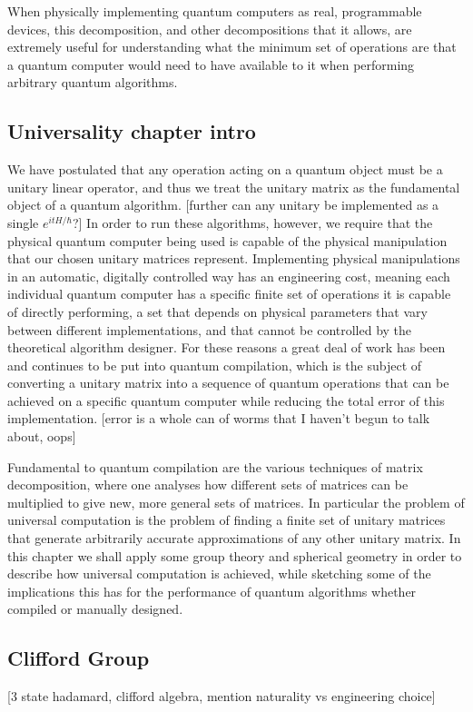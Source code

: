 \documentclass[]{article}
\begin{document}
When physically implementing quantum computers as real, programmable devices, this decomposition, and other decompositions that it allows, are extremely useful for understanding what the minimum set of operations are that a quantum computer would need to have available to it when performing arbitrary quantum algorithms.

\subsection{Universality chapter intro}
We have postulated that any operation acting on a quantum object must be a unitary linear operator, and thus we treat the unitary matrix as the fundamental object of a quantum algorithm. [further can any unitary be implemented as a single $e^{itH/\hbar}$?] In order to run these algorithms, however, we require that the physical quantum computer being used is capable of the physical manipulation that our chosen unitary matrices represent. Implementing physical manipulations in an automatic, digitally controlled way has an engineering cost, meaning each individual quantum computer has a specific finite set of operations it is capable of directly performing, a set that depends on physical parameters that vary between different implementations, and that cannot be controlled by the theoretical algorithm designer. For these reasons a great deal of work has been and continues to be put into quantum compilation, which is the subject of converting a unitary matrix into a sequence of quantum operations that can be achieved on a specific quantum computer while reducing the total error of this implementation. [error is a whole can of worms that I haven't begun to talk about, oops]

Fundamental to quantum compilation are the various techniques of matrix decomposition, where one analyses how different sets of matrices can be multiplied to give new, more general sets of matrices. In particular the problem of universal computation is the problem of finding a finite set of unitary matrices that generate arbitrarily accurate approximations of any other unitary matrix. In this chapter we shall apply some group theory and spherical geometry in order to describe how universal computation is achieved, while sketching some of the implications this has for the performance of quantum algorithms whether compiled or manually designed.

\subsection{Clifford Group}
[3 state hadamard, clifford algebra, mention naturality vs engineering choice]
\end{document}
